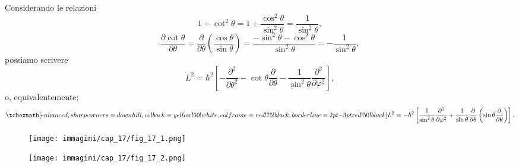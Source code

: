 \documentclass[a4paper,12pt,oneside]{book}
\begin{document}
Considerando le relazioni
	\begin{equation}
		1+ \cot ^2 \theta = 1+\frac{\cos ^2 \theta}{\sin ^2 \theta} = \frac{1}{\sin ^2 \theta},
	\end{equation}
	\begin{equation}
		\frac{\partial \cot \theta}{\partial \theta}= \frac{\partial}{\partial \theta}\left( \frac{\cos  \theta}{\sin \theta} \right) = \frac{-\sin ^ 2 \theta - \cos ^2 \theta}{\sin ^2 \theta}=-\frac{1}{\sin ^2 \theta},
	\end{equation}
possiamo scrivere
	\begin{equation}
		L^2 = \hbar ^2 \left[- \frac{\partial ^2}{\partial \theta ^2}-\cot \theta \frac{\partial}{\partial \theta}- \frac{1}{\sin ^2 \theta}\frac{\partial ^2}{\partial \varphi ^2}\right] ,
	\end{equation}
o, equivalentemente:
	\begin{equation}
		\tcboxmath[enhanced, sharp corners=downhill, colback=yellow!50!white, colframe=red!75!black, borderline={2pt}{-3pt}{red!50!black}]{
			L^2 = -\hbar ^2 \left[\frac{1}{\sin ^2 \theta}\frac{\partial ^2}{\partial \varphi ^2}+\frac{1}{\sin \theta}\frac{\partial}{\partial \theta} \left(\sin \theta \frac{\partial}{\partial \theta}\right)\right] .
			}
	\end{equation}
\newpage
\begin{figure}[!htbp]
\begin{center}
\texttt{[image: immagini/cap\_17/fig\_17\_1.png]}\\
\end{center}
\end{figure}
\begin{figure}[!htbp]
\begin{center}
\texttt{[image: immagini/cap\_17/fig\_17\_2.png]}\\
\end{center}
\end{figure}
\end{document}
